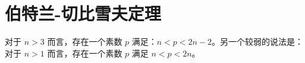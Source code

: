 \chapter{伯特兰-切比雪夫定理}
对于 $n > 3$ 而言，存在一个素数 $p$ 满足：$n < p < 2n - 2$。另一个较弱的说法是：
对于 $n > 1$ 而言，存在一个素数 $p$ 满足 $n < p < 2n$。
